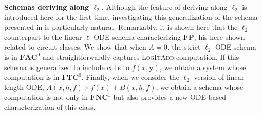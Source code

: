 \documentclass[11pt, oneside]{article}
\newcommand{\FP}{\mathbf{FP}}
\newcommand{\NC}{\mathbf{FNC}}
\newcommand{\AC}{\mathbf{FAC}}
\newcommand{\TC}{\mathbf{FTC}}
\newcommand{\tu}[1]{\mathbf{#1}}
\theoremstyle{definition}
\begin{document}
{\noindent\textbf{Schemas deriving along $\ell_2$.}
Although the feature of deriving along $\ell_2$ is introduced here for the first time, investigating this generalization of the schema presented in \cite{BournezDurand19} is particularly natural. Remarkably, it is shown here that the $\ell_2$ counterpart to the linear $\ell$-ODE schema characterizing $\FP$, his here shown related to circuit classes. 
%
We show that when $A = 0$, the strict $\ell_2$-ODE schema is in $\AC^0$ and straightforwardly captures \textsc{LogItAdd} computation.
%
If this schema is generalized to include calls to $f(x, \tu y)$, we obtain a system whose computation is in $\TC^0 $.
%
Finally, when we consider the $\ell_2$ version of linear-length ODE, $A(x,h, f) \times f(x) + B(x,h, f)$, we obtain a schema whose computation is not only in $\NC^1$ but also provides a new ODE-based characterization of this class.
 } %
\end{document}
